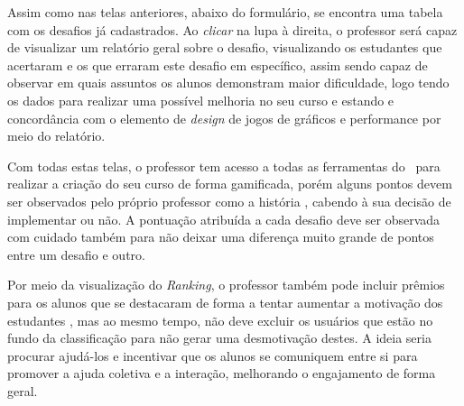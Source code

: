 
Assim como nas telas anteriores, abaixo do formulário, se encontra uma tabela com os desafios já cadastrados. Ao \textit{clicar} na lupa à direita, o professor será capaz de visualizar um relatório geral sobre o desafio, visualizando os estudantes que acertaram e os que erraram este desafio em específico, assim sendo capaz de observar em quais assuntos os alunos demonstram maior dificuldade, logo tendo os dados para realizar uma possível melhoria no seu curso e estando e concordância com o elemento de \textit{design} de jogos de gráficos e performance por meio do relatório.


Com todas estas telas, o professor tem acesso a todas as ferramentas do \appName\ para realizar a criação do seu curso de forma gamificada, porém alguns pontos devem ser observados pelo próprio professor como a história \cite{gamification_motivates}, cabendo à sua decisão de implementar ou não. A pontuação atribuída a cada desafio deve ser observada com cuidado também para não deixar uma diferença muito grande de pontos entre um desafio e outro. 

Por meio da visualização do \textit{Ranking}, o professor também pode incluir prêmios para os alunos que se destacaram de forma a tentar aumentar a motivação dos estudantes \cite{ranking_motivation}, mas ao mesmo tempo, não deve excluir os usuários que estão no fundo da classificação para não gerar uma desmotivação destes. A ideia seria procurar ajudá-los e incentivar que os alunos se comuniquem entre si para promover a ajuda coletiva e a interação, melhorando o engajamento de forma geral.

